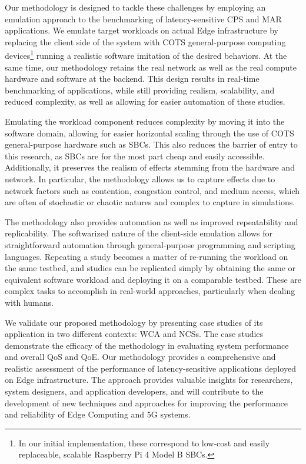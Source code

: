 Our methodology is designed to tackle these challenges by employing an emulation approach to the benchmarking of latency-sensitive \gls{CPS} and \gls{MAR} applications. 
We emulate target workloads on actual Edge infrastructure by replacing the client side of the system with \gls{COTS} general-purpose computing devices\footnote{%
    In our initial implementation, these correspond to low-cost and easily replaceable, scalable Raspberry Pi 4 Model B \acsp{SBC}.
} running a realistic software imitation of the desired behaviors.
At the same time, our methodology retains the real network as well as the real compute hardware and software at the backend.
This design results in real-time benchmarking of applications, while still providing realism, scalability, and reduced complexity, as well as allowing for easier automation of these studies.

Emulating the workload component reduces complexity by moving it into the software domain, allowing for easier horizontal scaling through the use of \gls{COTS} general-purpose hardware such as \glspl{SBC}.
This also reduces the barrier of entry to this research, as \glspl{SBC} are for the most part cheap and easily accessible.
Additionally, it preserves the realism of effects stemming from the hardware and network.
In particular, the methodology allows us to capture effects due to network factors such as contention, congestion control, and medium access, which are often of stochastic or chaotic natures and complex to capture in simulations.

The methodology also provides automation as well as improved repeatability and replicability.
The softwarized nature of the client-side emulation allows for straightforward automation through general-purpose programming and scripting languages.
Repeating a study becomes a matter of re-running the workload on the same testbed, and studies can be replicated simply by obtaining the same or equivalent software workload and deploying it on a comparable testbed.
These are complex tasks to accomplish in real-world approaches, particularly when dealing with humans.

We validate our proposed methodology by presenting case studies of its application in two different contexts: \gls{WCA} and \glspl{NCS}.
The case studies demonstrate the efficacy of the methodology in evaluating system performance and overall \gls{QoS} and \gls{QoE}.
Our methodology provides a comprehensive and realistic assessment of the performance of latency-sensitive applications deployed on Edge infrastructure.
The approach provides valuable insights for researchers, system designers, and application developers, and will contribute to the development of new techniques and approaches for improving the performance and reliability of Edge Computing and 5G systems.

